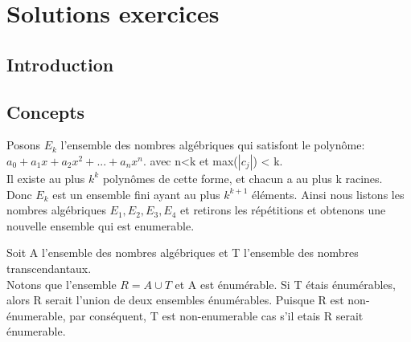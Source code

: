 
\chapter{Solutions exercices}
\label{ch:solExer}

%

\section{Introduction}





\section{Concepts}

 Posons $E_k$ l'ensemble des nombres algébriques qui satisfont le polynôme:\\
   $a_0 + a_1x + a_2x^2 + ... + a_nx^n$. avec n<k et max($|c_j|$) < k.\\
 Il existe au plus $k^k$ polynômes de cette forme,
et chacun a au plus k racines.\\
Donc $E_k$ est un ensemble fini ayant au plus $k^{k+1}$ éléments. Ainsi nous listons les nombres algébriques $E_1, E_2, E_3, E_4$ et retirons les répétitions et obtenons une nouvelle ensemble qui est enumerable.
 
 


Soit A l’ensemble des nombres algébriques et T l’ensemble des nombres transcendantaux.\\
Notons que l'ensemble $R = A \cup T$ et A est énumérable. Si T étais énumérables, alors R serait l’union de deux ensembles énumérables. Puisque R est non-énumerable, par conséquent, T est non-enumerable cas s'il etais R serait énumerable.

